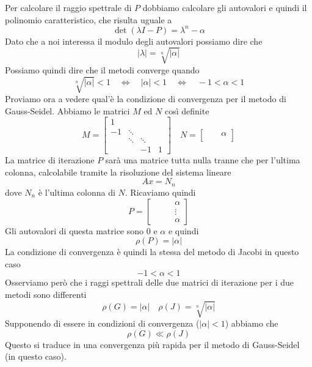 \begin{example}
	Per calcolare il raggio spettrale di $P$ dobbiamo calcolare gli autovalori e quindi il polinomio
	caratteristico, che risulta uguale a
	\[ \det(\lambda I - P) = \lambda^n - \alpha \]
	Dato che a noi interessa il modulo degli autovalori possiamo dire che
	\[ |\lambda| = \sqrt[n]{|\alpha|} \]
	Possiamo quindi dire che il metodi converge quando
	\[
		\sqrt[n]{|\alpha|} < 1 \quad
		\Leftrightarrow \quad |\alpha| < 1 \quad
		\Leftrightarrow \quad -1 < \alpha < 1
	\]
	Proviamo ora a vedere qual'è la condizione di convergenza per il metodo di Gauss-Seidel. Abbiamo le matrici
	$M$ ed $N$ così definite
	\[
		M = \begin{bmatrix}
			1  &        &            \\
			-1 & \ddots &            \\
			   & \ddots & \ddots     \\
			   &        & -1     & 1
		\end{bmatrix} \quad
		N = \begin{bmatrix}
			 &  & \alpha \\
			 &  &
		\end{bmatrix}
	\]
	La matrice di iterazione $P$ sarà una matrice tutta nulla tranne che per l'ultima colonna, calcolabile
	tramite la risoluzione del sistema lineare
	\[ A x = N_n \]
	dove $N_n$ è l'ultima colonna di $N$. Ricaviamo quindi
	\[
		P = \begin{bmatrix}
			 &  &  & \alpha \\
			 &  &  & \vdots \\
			 &  &  & \alpha
		\end{bmatrix}
	\]
	Gli autovalori di questa matrice sono 0 e $\alpha$ e quindi
	\[ \rho(P) = |\alpha| \]
	La condizione di convergenza è quindi la stessa del metodo di Jacobi in questo caso
	\[ -1 < \alpha < 1 \]
	Osserviamo però che i raggi spettrali delle due matrici di iterazione per i due metodi sono differenti
	\[ \rho(G) = |\alpha| \quad \rho(J) = \sqrt[n]{|\alpha|} \]
	Supponendo di essere in condizioni di convergenza ($|\alpha| < 1$) abbiamo che
	\[ \rho(G) \ll \rho(J) \]
	Questo si traduce in una convergenza più rapida per il metodo di Gauss-Seidel (in questo caso).
\end{example}

